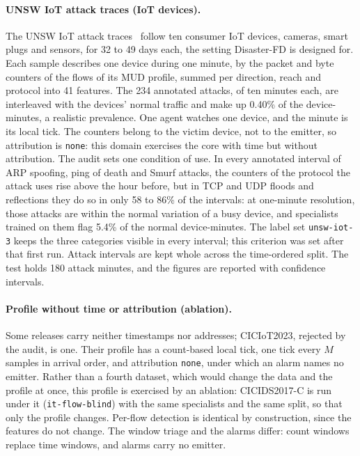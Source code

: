 \paragraph{UNSW IoT attack traces (IoT devices).}
The UNSW IoT attack traces~\cite{hamza2019unsw} follow ten consumer IoT devices, cameras,
smart plugs and sensors, for 32 to 49 days each, the setting Disaster-FD is designed for.
Each sample describes one device during one minute, by the packet and byte counters of the
flows of its MUD profile, summed per direction, reach and protocol into 41 features. The
234 annotated attacks, of ten minutes each, are interleaved with the devices' normal
traffic and make up 0.40\% of the device-minutes, a realistic prevalence. One agent watches
one device, and the minute is its local tick. The counters belong to the victim device,
not to the emitter, so attribution is \texttt{none}: this domain exercises the core with
time but without attribution. The audit sets one condition of use. In every
annotated interval of ARP spoofing, ping of death and Smurf attacks, the counters of the
protocol the attack uses rise above the hour before, but in TCP and UDP floods and
reflections they do so in only 58 to 86\% of the intervals: at one-minute resolution,
those attacks are within the normal variation of a busy device, and specialists trained on
them flag 5.4\% of the normal device-minutes. The label set \texttt{unsw-iot-3} keeps the
three categories visible in every interval; this criterion was set after that first run.
Attack intervals are kept whole across the time-ordered split. The test holds 180 attack
minutes, and the figures are reported with confidence intervals.

\paragraph{Profile without time or attribution (ablation).}
Some releases carry neither timestamps nor addresses; CICIoT2023, rejected by the audit,
is one. Their profile has a count-based local tick, one tick every $M$ samples in arrival
order, and attribution \texttt{none}, under which an alarm names no
emitter. Rather than a fourth dataset, which would change the data and the profile at
once, this profile is exercised by an ablation: CICIDS2017-C is run under it
(\texttt{it-flow-blind}) with the same specialists and the same split, so that only the
profile changes. Per-flow detection is identical by construction, since the features do
not change. The window triage and the alarms differ: count windows replace time windows,
and alarms carry no emitter.

